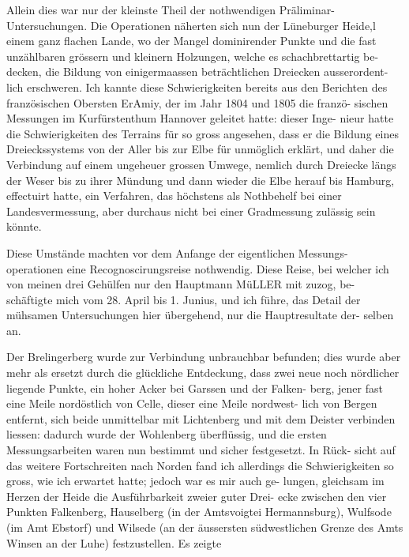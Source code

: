 \documentclass[12pt,a4paper]{article}
\theoremstyle{plain}
\theoremstyle{definition}
\theoremstyle{remark}
\begin{document}
\noindent
Allein dies war nur der kleinste Theil der nothwendigen Präliminar-
Untersuchungen. Die Operationen näherten sich nun der Lüneburger Heide,l
einem ganz flachen Lande, wo der Mangel dominirender Punkte und die fast
unzählbaren grössern und kleinern Holzungen, welche es schachbrettartig be-
decken, die Bildung von einigermaassen beträchtlichen Dreiecken ausserordent-
lich erschweren. Ich kannte diese Schwierigkeiten bereits aus den Berichten
des französischen Obersten ErAmiy, der im Jahr 1804 und 1805 die franzö-
sischen Messungen im Kurfürstenthum Hannover geleitet hatte: dieser Inge-
nieur hatte die Schwierigkeiten des Terrains für so gross angesehen, dass er
die Bildung eines Dreieckssystems von der Aller bis zur Elbe für unmöglich
erklärt, und daher die Verbindung auf einem ungeheuer grossen Umwege,
nemlich durch Dreiecke längs der Weser bis zu ihrer Mündung und dann
wieder die Elbe herauf bis Hamburg, effectuirt hatte, ein Verfahren, das
höchstens als Nothbehelf bei einer Landesvermessung, aber durchaus nicht
bei einer Gradmessung zulässig sein könnte.

\noindent
Diese Umstände machten vor dem Anfange der eigentlichen Messungs-
operationen eine Recognoscirungsreise nothwendig. Diese Reise, bei welcher
ich von meinen drei Gehülfen nur den Hauptmann MüLLER mit zuzog, be-
schäftigte mich vom 28. April bis 1. Junius, und ich führe, das Detail der
mühsamen Untersuchungen hier übergehend, nur die Hauptresultate der-
selben an.

\noindent
Der Brelingerberg wurde zur Verbindung unbrauchbar befunden; dies
wurde aber mehr als ersetzt durch die glückliche Entdeckung, dass zwei neue
noch nördlicher liegende Punkte, ein hoher Acker bei Garssen und der Falken-
berg, jener fast eine Meile nordöstlich von Celle, dieser eine Meile nordwest-
lich von Bergen entfernt, sich beide unmittelbar mit Lichtenberg und mit dem
Deister verbinden liessen: dadurch wurde der Wohlenberg überflüssig, und die
ersten Messungsarbeiten waren nun bestimmt und sicher festgesetzt. In Rück-
sicht auf das weitere Fortschreiten nach Norden fand ich allerdings die
Schwierigkeiten so gross, wie ich erwartet hatte; jedoch war es mir auch ge-
lungen, gleichsam im Herzen der Heide die Ausführbarkeit zweier guter Drei-
ecke zwischen den vier Punkten Falkenberg, Hauselberg (in der Amtsvoigtei
Hermannsburg), Wulfsode (im Amt Ebstorf) und Wilsede (an der äussersten
südwestlichen Grenze des Amts Winsen an der Luhe) festzustellen. Es zeigte

\noindent
\end{document}
